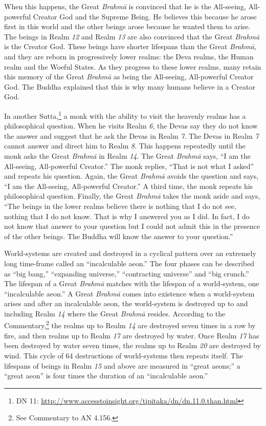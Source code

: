 When this happens, the Great \textit{Brahmā} is convinced that he is the All-seeing, All-powerful Creator God and the Supreme Being. He believes this because he arose first in this world and the other beings arose because he wanted them to arise. The beings in Realm \textit{12} and Realm \textit{13} are also convinced that the Great \textit{Brahmā} is the Creator God. These beings have shorter lifespans than the Great \textit{Brahmā}, and they are reborn in progressively lower realms: the Deva realms, the Human realm and the Woeful States. As they progress to these lower realms, many retain this memory of the Great \textit{Brahmā} as being the All-seeing, All-powerful Creator God. The Buddha explained that this is why many humans believe in a Creator God.

In another Sutta,\footnote{DN 11: \url{http://www.accesstoinsight.org/tipitaka/dn/dn.11.0.than.html}} a monk with the ability to visit the heavenly realms has a philosophical question. When he visits Realm \textit{6}, the Devas say they do not know the answer and suggest that he ask the Devas in Realm \textit{7}. The Devas in Realm \textit{7} cannot answer and direct him to Realm \textit{8}. This happens repeatedly until the monk asks the Great \textit{Brahmā} in Realm \textit{14}. The Great \textit{Brahmā} says, “I am the All-seeing, All-powerful Creator.” The monk replies, “That is not what I asked” and repeats his question. Again, the Great \textit{Brahmā} avoids the question and says, “I am the All-seeing, All-powerful Creator.” A third time, the monk repeats his philosophical question. Finally, the Great \textit{Brahmā} takes the monk aside and says, “The beings in the lower realms believe there is nothing that I do not see, nothing that I do not know. That is why I answered you as I did. In fact, I do not know that answer to your question but I could not admit this in the presence of the other beings. The Buddha will know the answer to your question.”

World-systems are created and destroyed in a cyclical pattern over an extremely long time-frame called an “incalculable aeon.” The four phases can be described as “big bang,” “expanding universe,” “contracting universe” and “big crunch.” The lifespan of a Great \textit{Brahmā} matches with the lifespan of a world-system, one “incalculable aeon.” A Great \textit{Brahmā} comes into existence when a world-system arises and after an incalculable aeon, the world-system is destroyed up to and including Realm \textit{14} where the Great \textit{Brahmā} resides. According to the Commentary,\footnote{See Commentary to AN 4.156.} the realms up to Realm \textit{14} are destroyed seven times in a row by fire, and then realms up to Realm \textit{17} are destroyed by water. Once Realm \textit{17} has been destroyed by water seven times, the realms up to Realm \textit{20} are destroyed by wind. This cycle of 64 destructions of world-systems then repeats itself. The lifespans of beings in Realm \textit{15} and above are measured in “great aeons;” a “great aeon” is four times the duration of an “incalculable aeon.”

